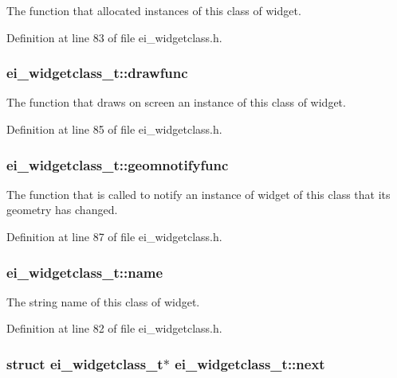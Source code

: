 The function that allocated instances of this class of widget. 

Definition at line 83 of file ei\_\-widgetclass.h.\hypertarget{structei__widgetclass__t_a528168099a2a1515c4cf65400ccbfff2}{
\subsubsection[{drawfunc}]{ {\bf ei\_\-widgetclass\_\-t::drawfunc}}}
\label{structei__widgetclass__t_a528168099a2a1515c4cf65400ccbfff2}


The function that draws on screen an instance of this class of widget. 

Definition at line 85 of file ei\_\-widgetclass.h.\hypertarget{structei__widgetclass__t_aaf0aa3f54a48a6b3f8b8e12574ede4b7}{
\subsubsection[{geomnotifyfunc}]{ {\bf ei\_\-widgetclass\_\-t::geomnotifyfunc}}}
\label{structei__widgetclass__t_aaf0aa3f54a48a6b3f8b8e12574ede4b7}


The function that is called to notify an instance of widget of this class that its geometry has changed. 

Definition at line 87 of file ei\_\-widgetclass.h.\hypertarget{structei__widgetclass__t_aa5799b5999890cf04915bf0fe5151ec8}{
\subsubsection[{name}]{ {\bf ei\_\-widgetclass\_\-t::name}}}
\label{structei__widgetclass__t_aa5799b5999890cf04915bf0fe5151ec8}


The string name of this class of widget. 

Definition at line 82 of file ei\_\-widgetclass.h.\hypertarget{structei__widgetclass__t_aa184e650475ec2451f033858db1876f0}{
\subsubsection[{next}]{\setlength{\rightskip}{0pt plus 5cm}struct {\bf ei\_\-widgetclass\_\-t}$\ast$ {\bf ei\_\-widgetclass\_\-t::next}}}
\label{structei__widgetclass__t_aa184e650475ec2451f033858db1876f0}


